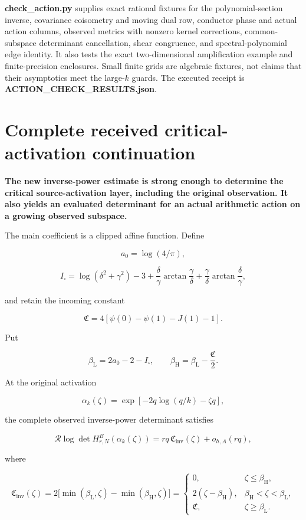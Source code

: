 \documentclass[11pt]{article}
\begin{document}
\textbf{check\_action.py} supplies exact rational fixtures for the polynomial-section inverse, covariance coisometry and moving dual row, conductor phase and actual action columns, observed metrics with nonzero kernel corrections, common-subspace determinant cancellation, shear congruence, and spectral-polynomial edge identity. It also tests the exact two-dimensional amplification example and finite-precision enclosures. Small finite grids are algebraic fixtures, not claims that their asymptotics meet the large-\(k\) guards. The executed receipt is \textbf{ACTION\_CHECK\_RESULTS.json}.


\clearpage\part{Complete received critical-activation continuation}
\textbf{The new inverse-power estimate is strong enough to determine the critical source-activation layer, including the original observation. It also yields an evaluated determinant for an actual arithmetic action on a growing observed subspace.}

The main coefficient is a clipped affine function. Define

\[
a_0=\log(4/\pi),
\]

\[
I_\square=
\log(\delta^2+\gamma^2)-3
+\frac{\delta}{\gamma}\arctan\frac{\gamma}{\delta}
+\frac{\gamma}{\delta}\arctan\frac{\delta}{\gamma},
\]

and retain the incoming constant

\[
\mathfrak C
=
4[\psi(0)-\psi(1)-J(1)-1].
\]

Put

\[
\beta_{\mathrm L}=2a_0-2-I_\square,
\qquad
\beta_{\mathrm H}=\beta_{\mathrm L}-\frac{\mathfrak C}{2}.
\]

At the original activation

\[
\boxed{
\alpha_k(\zeta)=
\exp[-2q\log(q/k)-\zeta q],
}
\]

the complete observed inverse-power determinant satisfies

\[
\boxed{
\mathcal R\log\det H^B_{r,N}(\alpha_k(\zeta))
=
rq\,\mathfrak C_{\mathrm{inv}}(\zeta)+o_{h,A}(rq),
}
\tag{1}
\]

where

\[
\boxed{
\mathfrak C_{\mathrm{inv}}(\zeta)
=
2\bigl[\min(\beta_{\mathrm L},\zeta)
-\min(\beta_{\mathrm H},\zeta)\bigr]
=
\begin{cases}
0,&\zeta\le\beta_{\mathrm H},\\
2(\zeta-\beta_{\mathrm H}),
&\beta_{\mathrm H}<\zeta<\beta_{\mathrm L},\\
\mathfrak C,&\zeta\ge\beta_{\mathrm L}.
\end{cases}
}
\tag{2}
\]
\end{document}
